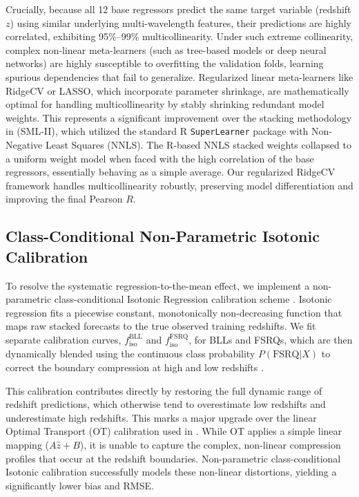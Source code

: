 \documentclass[twocolumn,linenumbers,floatfix]{aastex701}
\begin{document}
Crucially, because all 12 base regressors predict the same target variable (redshift $z$) using similar underlying multi-wavelength features, their predictions are highly correlated, exhibiting 95\%--99\% multicollinearity. Under such extreme collinearity, complex non-linear meta-learners (such as tree-based models or deep neural networks) are highly susceptible to overfitting the validation folds, learning spurious dependencies that fail to generalize. Regularized linear meta-learners like RidgeCV or LASSO, which incorporate parameter shrinkage, are mathematically optimal for handling multicollinearity by stably shrinking redundant model weights. This represents a significant improvement over the stacking methodology in \citet{Narendra2022} (SML-II), which utilized the standard R \texttt{SuperLearner} package with Non-Negative Least Squares (NNLS). The R-based NNLS stacked weights collapsed to a uniform weight model when faced with the high correlation of the base regressors, essentially behaving as a simple average. Our regularized RidgeCV framework handles multicollinearity robustly, preserving model differentiation and improving the final Pearson $R$.



\subsection{Class-Conditional Non-Parametric Isotonic Calibration}
\label{sec:calib}
To resolve the systematic regression-to-the-mean effect, we implement a non-parametric class-conditional Isotonic Regression calibration scheme \citep{Barlow1972}. Isotonic regression fits a piecewise constant, monotonically non-decreasing function that maps raw stacked forecasts to the true observed training redshifts. We fit separate calibration curves, $f_{\text{iso}}^{\text{BLL}}$ and $f_{\text{iso}}^{\text{FSRQ}}$, for BLLs and FSRQs, which are then dynamically blended using the continuous class probability $P(\text{FSRQ} | X)$ to correct the boundary compression at high and low redshifts \citep{Zadrozny2002}.

This calibration contributes directly by restoring the full dynamic range of redshift predictions, which otherwise tend to overestimate low redshifts and underestimate high redshifts. This marks a major upgrade over the linear Optimal Transport (OT) calibration used in \citet{Narendra2022}. While OT applies a simple linear mapping ($A\hat{z} + B$), it is unable to capture the complex, non-linear compression profiles that occur at the redshift boundaries. Non-parametric class-conditional Isotonic calibration successfully models these non-linear distortions, yielding a significantly lower bias and RMSE.
\end{document}
